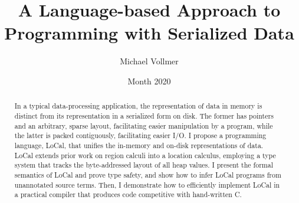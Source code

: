 \documentclass[showabstract,showacknowledgments,showpreface,showdedication]{iuphd}
\title{A Language-based Approach to Programming with Serialized Data}
\author{Michael Vollmer}
\date{Month 2020} %
\theoremstyle{nonumberplain}
\begin{document}
\maketitle
\acceptancepage










\begin{abstract}

In a typical data-processing application, the representation of data in memory is distinct from its representation in a serialized form on disk. The former has pointers and an arbitrary, sparse layout, facilitating easier manipulation by a program, while the latter is packed contiguously, facilitating easier I/O. I propose a programming language, LoCal, that unifies the in-memory and on-disk representations of data. LoCal extends prior work on region calculi into a location calculus, employing a type system that tracks the byte-addressed layout of all heap values.
%
I present the formal semantics of LoCal and prove type safety, and show how to infer LoCal programs from unannotated source terms. Then, I demonstrate how to efficiently implement LoCal in a practical compiler that produces code competitive with hand-written C.
\linebreak\vspace{1em}

\end{abstract}
\end{document}
